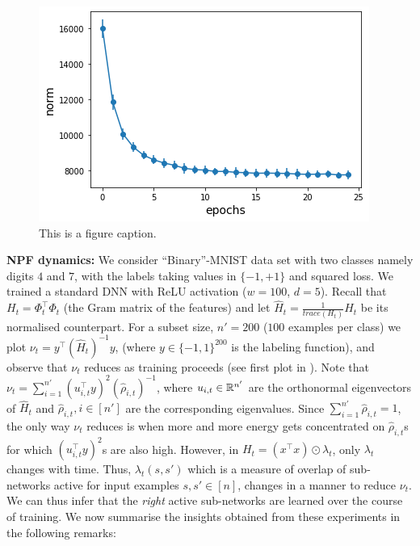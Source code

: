 \begin{figure}
\includegraphics[scale=0.25]{figs/path-gram.png}
\caption{\label{fig:frog1}This is a figure caption.}
\end{figure}
\textbf{NPF dynamics:} We consider ``Binary''-MNIST data set with two classes namely digits $4$ and $7$, with the labels taking values in $\{-1,+1\}$ and squared loss. We trained a standard DNN with ReLU activation ($w=100$, $d=5$). Recall that $H_t=\Phi^\top_t\Phi_t$  (the Gram matrix of the features) and let $\widehat{H}_t=\frac{1}{trace(H_t)}H_t$ be its normalised counterpart. For a subset size, $n'=200$ ($100$ examples per class) we plot $\nu_t=y^\top (\widehat{H}_t)^{-1} y$, (where $y\in\{-1,1\}^{200}$ is the labeling function), and observe that $\nu_t$ reduces as training proceeds (see first plot in ). Note that $\nu_t=\sum_{i=1}^{n'}(u_{i,t}^\top y)^2 (\hat{\rho}_{i,t})^{-1}$, where $u_{i,t}\in \mathbb{R}^{n'}$ are the orthonormal eigenvectors of $\widehat{H}_t$ and $\hat{\rho}_{i,t},i\in[n']$ are the corresponding eigenvalues. Since $\sum_{i=1}^{n'}\hat{\rho}_{i,t}=1$, the only way $\nu_t$ reduces is when more and more energy gets concentrated on $\hat{\rho}_{i,t}$s for which $(u_{i,t}^\top y)^2$s are also high. However, in $H_t=(x^\top x)\odot \lambda_t$, only $\lambda_t$ changes with time. Thus, $\lambda_t(s,s')$ which is a measure of overlap of sub-networks active for input examples $s,s'\in[n]$, changes in a manner to reduce $\nu_t$. We can thus infer that the \emph{right} active sub-networks are learned over the course of training. We now summarise the insights obtained from these experiments in the following remarks:\hfill\\
